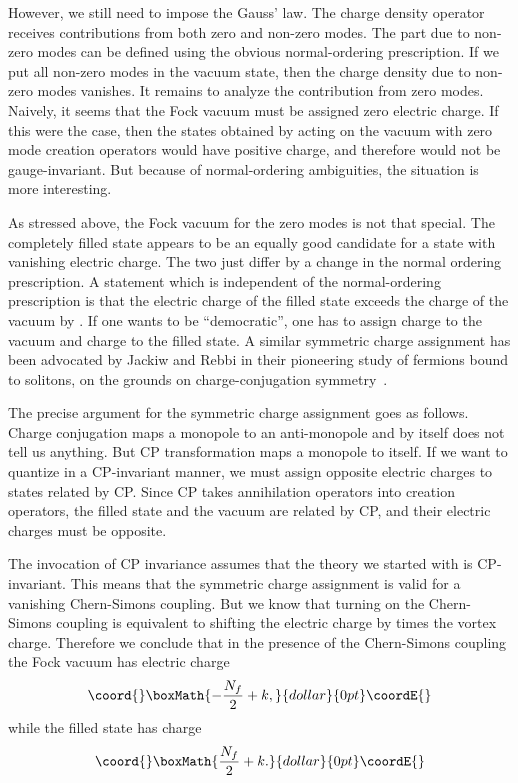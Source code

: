 \documentclass[a4paper,12pt, amsfonts, amssymb]{article}
\begin{document}
However, we still need to impose the Gauss' law. The charge density
operator receives contributions from both zero and non-zero modes.
The part due to non-zero modes can be defined using the obvious
normal-ordering prescription.
If we put all non-zero modes in the vacuum state, then the
charge density due to non-zero modes vanishes. It remains to analyze the
contribution from zero modes. Naively, it seems that the Fock
vacuum must be assigned zero electric charge. If this were the case,
then the states obtained by acting on the vacuum with zero mode creation operators would have positive charge, and therefore would not be
gauge-invariant. But because of normal-ordering ambiguities, 
the situation is more interesting.

As stressed above, the Fock vacuum for the zero
modes is not that special. The completely filled state appears to be
an equally good candidate for a state with vanishing electric charge. The
two just differ by a change in the normal ordering prescription.
A statement which is independent of the normal-ordering prescription
is that the electric charge of the filled state exceeds the charge of the
vacuum by \coordHE{}. If one wants to be ``democratic'', one has 
to assign charge \coordHE{} to the vacuum and charge \coordHE{}
to the filled state. A similar symmetric charge assignment has been
advocated by Jackiw and Rebbi in their pioneering study of fermions bound 
to solitons, on the grounds on charge-conjugation symmetry~\cite{JR}.

The precise argument for the symmetric charge assignment goes as follows.
Charge conjugation maps a monopole to an anti-monopole and by itself does
not tell us anything. But CP transformation maps a monopole to itself.
If we want to quantize in a CP-invariant
manner, we must assign opposite electric charges to states related by CP.
Since CP takes annihilation operators into creation operators,
the filled state and the vacuum are related by CP, and their electric
charges must be opposite.

The invocation of CP invariance assumes that the theory
we started with is CP-invariant. This means that the symmetric
charge assignment is valid for a vanishing Chern-Simons coupling. But we
know that turning on the Chern-Simons coupling \coordHE{} is equivalent
to shifting the electric charge by \coordHE{} times the
vortex charge. Therefore we conclude that in the
presence of the Chern-Simons coupling the Fock vacuum has electric charge
$$\coord{}\boxMath{
-\frac{N_f}{2}+k,
}{dollar}{0pt}\coordE{}$$
while the filled state has charge
$$\coord{}\boxMath{
\frac{N_f}{2}+k.
}{dollar}{0pt}\coordE{}$$
\end{document}
